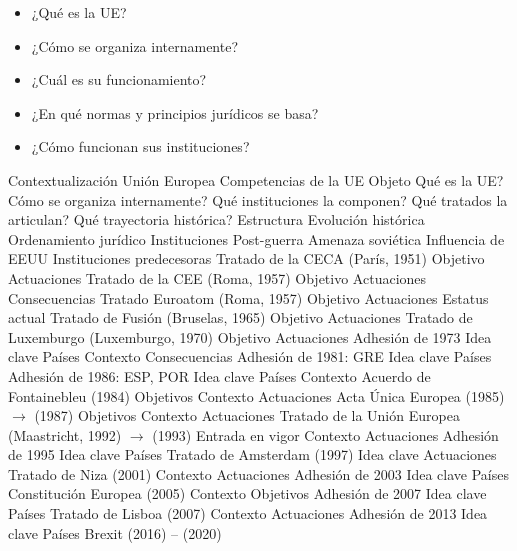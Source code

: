 \documentclass{nuevotema}
\begin{document}
\begin{itemize}
    \item ¿Qué es la UE?
    \item ¿Cómo se organiza internamente?
    \item ¿Cuál es su funcionamiento?
    \item ¿En qué normas y principios jurídicos se basa?
    \item ¿Cómo funcionan sus instituciones?
\end{itemize}

\esquemacorto

\begin{esquema}[enumerate]
	\1[] 
		\2 Contextualización
			\3 Unión Europea
			\3 Competencias de la UE
		\2 Objeto
			\3 Qué es la UE?
			\3 Cómo se organiza internamente?
			\3 Qué instituciones la componen?
			\3 Qué tratados la articulan?
			\3 Qué trayectoria histórica?
		\2 Estructura
			\3 Evolución histórica
			\3 Ordenamiento jurídico
			\3 Instituciones
	\1 
		\2 Post-guerra
			\3 Amenaza soviética
			\3 Influencia de EEUU
			\3 Instituciones predecesoras
		\2 Tratado de la CECA (París, 1951)
			\3 Objetivo
			\3 Actuaciones
		\2 Tratado de la CEE (Roma, 1957)
			\3 Objetivo
			\3 Actuaciones
			\3 Consecuencias
		\2 Tratado Euroatom (Roma, 1957)
			\3 Objetivo
			\3 Actuaciones
			\3 Estatus actual
		\2 Tratado de Fusión (Bruselas, 1965)
			\3 Objetivo
			\3 Actuaciones
		\2 Tratado de Luxemburgo (Luxemburgo, 1970)
			\3 Objetivo
			\3 Actuaciones
		\2 Adhesión de 1973
			\3 Idea clave
			\3 Países
			\3 Contexto
			\3 Consecuencias
		\2 Adhesión de 1981: GRE
			\3 Idea clave
			\3 Países
		\2 Adhesión de 1986: ESP, POR
			\3 Idea clave
			\3 Países
			\3 Contexto
		\2 Acuerdo de Fontainebleu (1984)
			\3 Objetivos
			\3 Contexto
			\3 Actuaciones
		\2 Acta Única Europea (1985) $\to$ (1987)
			\3 Objetivos
			\3 Contexto
			\3 Actuaciones
		\2 Tratado de la Unión Europea (Maastricht, 1992) $\to$ (1993)
			\3 Entrada en vigor
			\3 Contexto
			\3 Actuaciones
		\2 Adhesión de 1995
			\3 Idea clave
			\3 Países
		\2 Tratado de Amsterdam (1997)
			\3 Idea clave
			\3 Actuaciones
		\2 Tratado de Niza (2001)
			\3 Contexto
			\3 Actuaciones
		\2 Adhesión de 2003
			\3 Idea clave
			\3 Países
		\2 Constitución Europea (2005)
			\3 Contexto
			\3 Objetivos
		\2 Adhesión de 2007
			\3 Idea clave
			\3 Países
		\2 Tratado de Lisboa (2007)
			\3 Contexto
			\3 Actuaciones
		\2 Adhesión de 2013
			\3 Idea clave
			\3 Países
		\2 Brexit (2016) -- (2020)

\end{esquema}
\end{document}
